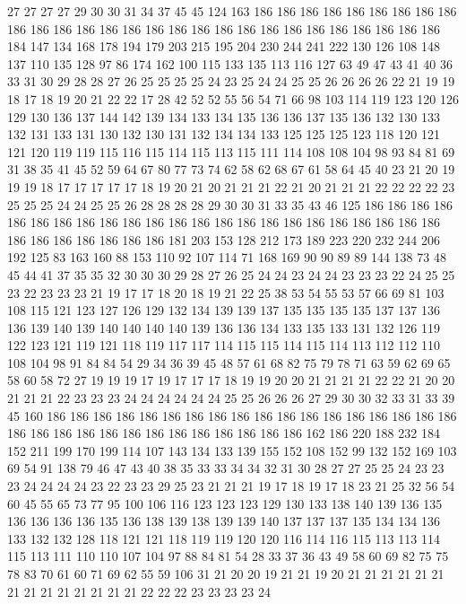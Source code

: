 27 27 27 27 29 30 30 31 34 37 45 45 124 163 186 186 186 186 186 186
186 186 186 186 186 186 186 186 186 186 186 186 186 186 186 186 186 186 186 186
186 186 184 147 134 168 178 194 179 203 215 195 204 230 244 241 222 130 126 108
148 137 110 135 128 97 86 174 162 100 115 133 135 113 116 127 63 49 47 43
41 40 36 33 31 30 29 28 28 27 26 25 25 25 25 24 23 25 24 24
25 25 26 26 26 26 22 21 19 19 18 17 18 19 20 21 22 22 17 28
42 52 52 55 56 54 71 66 98 103 114 119 123 120 126 129 130 136 137 144
142 139 134 133 134 135 136 136 137 135 136 132 130 133 132 131 133 131 130 132
130 131 132 134 134 133 125 125 125 123 118 120 121 121 120 119 119 115 116 115
114 115 113 115 111 114 108 108 104 98 93 84 81 69 31 38 35 41 45 52
59 64 67 80 77 73 74 62 58 62 68 67 61 58 64 45 40 23 21 20
19 19 19 18 17 17 17 17 17 18 19 20 21 20 21 21 21 22 21 20
21 21 21 22 22 22 22 23 25 25 25 24 24 25 25 26 28 28 28 28
29 30 30 31 33 35 43 46 125 186 186 186 186 186 186 186 186 186 186 186
186 186 186 186 186 186 186 186 186 186 186 186 186 186 186 186 186 186 186 181
203 153 128 212 173 189 223 220 232 244 206 192 125 83 163 160 88 153 110 92
107 114 71 168 169 90 90 89 89 144 138 73 48 45 44 41 37 35 35 32
30 30 30 29 28 27 26 25 24 24 23 24 24 23 23 23 22 24 25 25
23 22 23 23 23 21 19 17 17 18 20 18 19 21 22 25 38 53 54 55
53 57 66 69 81 103 108 115 121 123 127 126 129 132 134 139 139 137 135 135
135 135 137 137 136 136 139 140 139 140 140 140 140 139 136 136 134 133 135 133
131 132 126 119 122 123 121 119 121 118 119 117 117 114 115 115 114 115 114 113
112 112 110 108 104 98 91 84 84 54 29 34 36 39 45 48 57 61 68 82
75 79 78 71 63 59 62 69 65 58 60 58 72 27 19 19 19 17 19 17
17 17 18 19 19 20 20 21 21 21 21 22 22 21 20 20 21 21 21 22
23 23 23 24 24 24 24 24 24 25 25 26 26 26 27 29 30 30 32 33
31 33 39 45 160 186 186 186 186 186 186 186 186 186 186 186 186 186 186 186
186 186 186 186 186 186 186 186 186 186 186 186 186 186 186 186 162 186 220 188
232 184 152 211 199 170 199 114 107 143 134 133 139 155 152 108 152 99 132 152
169 103 69 54 91 138 79 46 47 43 40 38 35 33 33 34 34 32 31 30
28 27 27 25 25 24 23 23 23 24 24 24 24 23 22 23 23 29 25 23
21 21 21 19 17 18 19 17 18 23 21 25 32 56 54 60 45 55 65 73
77 95 100 106 116 123 123 123 129 130 133 138 140 139 136 135 136 136 136 136
135 136 138 139 138 139 139 140 137 137 137 135 134 134 136 133 132 132 128 118
121 121 118 119 119 120 120 116 114 116 115 113 113 114 115 113 111 110 110 107
104 97 88 84 81 54 28 33 37 36 43 49 58 60 69 82 75 75 78 83
70 61 60 71 69 62 55 59 106 31 21 20 20 19 21 21 19 20 21 21
21 21 21 21 21 21 21 21 21 21 21 21 22 22 22 23 23 23 23 24
